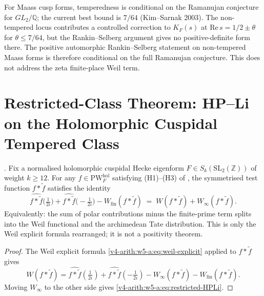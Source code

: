 \begin{remark}
\label{v4-arith:w5-a:rem:non-tempered}
For Maass cusp forms, temperedness is conditional on the Ramanujan
conjecture for \(GL_{2}/\mathbb{Q}\); the current best bound is
\(7/64\) (Kim--Sarnak 2003). The non-tempered locus contributes a
controlled correction to \(K_{F}(s)\) at
\(\mathrm{Re}\,s=1/2\pm\theta\) for \(\theta\leq 7/64\), but the
Rankin--Selberg argument gives no positive-definite form there. The
positive automorphic Rankin--Selberg statement on non-tempered Maass
forms is therefore conditional on the full
Ramanujan conjecture.
This does not address the zeta finite-place Weil term.
\end{remark}

\section{Restricted-Class Theorem: HP--Li on the Holomorphic Cuspidal Tempered Class}
\label{v4-arith:w5-a:restricted-theorem}

\begin{theorem}
\label{v4-arith:w5-a:thm:HPLi-restricted}
\ClaimStatusProvedHere. Fix a normalised holomorphic cuspidal Hecke
eigenform \(F\in S_{k}(\mathrm{SL}_{2}(\mathbb{Z}))\) of weight
\(k\geq 12\). For any \(f\in\mathrm{PW}^{\mathrm{hol}}_{F}\) satisfying
(H1)--(H3) of , the
symmetrised test function \(f*\widetilde{f}\) satisfies the identity
\begin{equation}
\label{v4-arith:w5-a:eq:restricted-HPLi}
\widehat{f*\widetilde{f}}\bigl(\tfrac{1}{2i}\bigr)+\widehat{f*\widetilde{f}}\bigl(-\tfrac{1}{2i}\bigr)
-W_{\mathrm{fin}}(f*\widetilde{f})
\;=\;W(f*\widetilde f)+W_{\infty}(f*\widetilde{f}).
\end{equation}
Equivalently: the sum of polar contributions minus the finite-prime
term splits into the Weil functional and the archimedean Tate
distribution. This is only the Weil explicit formula rearranged; it is
not a positivity theorem.
\end{theorem}

\begin{proof}
The Weil explicit formula
\eqref{v4-arith:w5-a:eq:weil-explicit} applied to \(f*\widetilde{f}\)
gives
\[
W(f*\widetilde f)=
\widehat{f*\widetilde{f}}(\tfrac{1}{2i})
+\widehat{f*\widetilde{f}}(-\tfrac{1}{2i})
-W_{\infty}(f*\widetilde f)-W_{\mathrm{fin}}(f*\widetilde f).
\]
Moving \(W_{\infty}\) to the other side gives
\eqref{v4-arith:w5-a:eq:restricted-HPLi}.
\end{proof}

